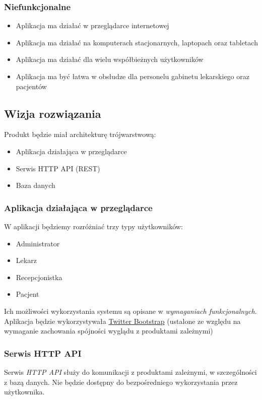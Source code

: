 \documentclass[10pt,a4paper]{article}
\begin{document}
\subsubsection{Niefunkcjonalne}
\begin{itemize}
    \item Aplikacja ma działać w przeglądarce internetowej
    \item Aplikacja ma działać na komputerach stacjonarnych, laptopach oraz tabletach
    \item Aplikacja ma działać dla wielu współbieżnych użytkowników
    \item Aplikacja ma być łatwa w obsłudze dla personelu gabinetu lekarskiego oraz pacjentów
\end{itemize}

\subsection{Wizja rozwiązania}
Produkt będzie miał architekturę trójwarstwową:

\begin{itemize}
  \item Aplikacja działająca w przeglądarce
  \item Serwis HTTP API (REST)
  \item Baza danych
\end{itemize}

\subsubsection{Aplikacja działająca w przeglądarce}

W aplikacji będziemy rozróżniać trzy typy użytkowników:
\begin{itemize}
    \item Administrator
    \item Lekarz
    \item Recepcjonistka
    \item Pacjent
\end{itemize}
Ich możliwości wykorzystania systemu są opisane w \emph{wymaganiach funkcjonalnych}. Aplikacja będzie wykorzystywała \href{https://getbootstrap.com/}{Twitter Bootstrap} (ustalone ze względu na wymaganie zachowania spójności wyglądu z produktami zależnymi)

\subsubsection{Serwis HTTP API}
Serwis \emph{HTTP API} służy do komunikacji z produktami zależnymi, w szczególności z bazą danych. Nie będzie dostępny do bezpośredniego wykorzystania przez użytkownika.
\end{document}
